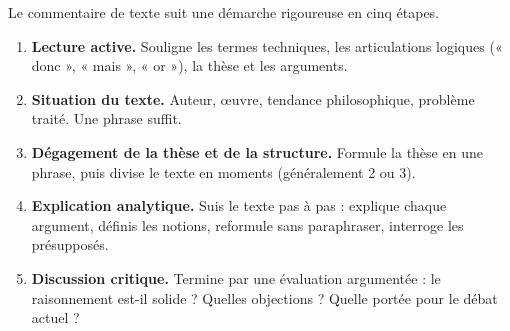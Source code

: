 \documentclass[11pt]{article}
\begin{document}
\begin{methode}
Le commentaire de texte suit une démarche rigoureuse en cinq étapes.

\begin{enumerate}
\item \textbf{Lecture active.} Souligne les termes techniques, les articulations logiques (« donc », « mais », « or »), la thèse et les arguments.
\item \textbf{Situation du texte.} Auteur, œuvre, tendance philosophique, problème traité. Une phrase suffit.
\item \textbf{Dégagement de la thèse et de la structure.} Formule la thèse en une phrase, puis divise le texte en moments (généralement 2 ou 3).
\item \textbf{Explication analytique.} Suis le texte pas à pas : explique chaque argument, définis les notions, reformule sans paraphraser, interroge les présupposés.
\item \textbf{Discussion critique.} Termine par une évaluation argumentée : le raisonnement est-il solide ? Quelles objections ? Quelle portée pour le débat actuel ?
\end{enumerate}
\end{methode}
\end{document}
